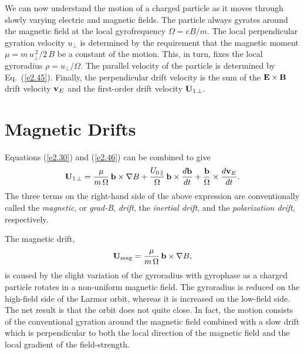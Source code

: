 We can now understand the motion of a charged particle as it moves through
slowly varying electric and magnetic fields. The particle always gyrates around
the magnetic field at the local gyrofrequency ${\Omega}=eB/m$. 
The local perpendicular gyration velocity $u_\perp$ is determined by the
requirement that the magnetic moment $\mu=m\,u_\perp^{~2}/ 2\,B$ be a
constant of the motion. This, in turn,  fixes the local gyroradius 
$\rho = u_\perp/{\Omega}$.
The parallel velocity of the particle is determined by Eq.~(\ref{e2.45}). 
Finally, the perpendicular drift velocity is the sum  of the ${\bf E}\times{\bf B}$
drift velocity ${\bf v}_E$ and the first-order drift velocity ${\bf U}_{1\,\perp}.$

\section{Magnetic Drifts}
Equations (\ref{e2.30}) and (\ref{e2.46}) can be combined to give
\begin{equation}\label{e2.47}
{\bf U}_{1\,\perp} = \frac{\mu}{m\,{\Omega}}\,
{\bf b}\times \nabla B +
\frac{U_{0\,\parallel}}{{\Omega}}\, {\bf b}\times\frac{d{\bf b}}{dt}
+ \frac{{\bf b}}{{\Omega}}\times \frac{d{\bf v}_E}{dt}.
\end{equation}
The three terms on the right-hand side of the above expression are conventionally
called the {\em magnetic}, or {\em grad-B}, {\em drift}, the {\em inertial
drift}, and the {\em polarization drift}, respectively. 

The magnetic drift,
\begin{equation}
{\bf U}_{\rm mag} = \frac{\mu}{m\,{\Omega}}\,
{\bf b}\times \nabla B,
\end{equation}
is caused by the slight variation of the gyroradius with gyrophase as a
charged  particle
rotates  in a non-uniform magnetic field. The gyroradius is reduced
on the high-field side of the Larmor orbit, whereas it is increased on the
low-field side. The net result is that the orbit does not quite
close. In fact, the motion consists of the conventional  gyration around the magnetic
field combined with a slow drift which is perpendicular to both the
local direction of the magnetic field and the local gradient of the 
field-strength.

